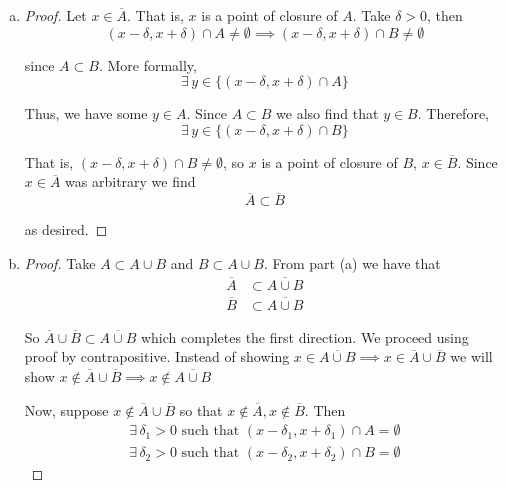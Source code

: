 \documentclass[12pt]{article}
\newlength\tindent
\renewcommand{\indent}{\hspace*{\tindent}}
\begin{document}
\begin{enumerate}[(a)]
	\item 
	\begin{proof} Let $x \in \overline{A}$. That is, $x$ is a point of closure of $A$. Take $\delta > 0$, then
	\begin{equation*}
		(x - \delta, x + \delta) \cap A \neq \emptyset \implies (x - \delta, x + \delta) \cap B \neq \emptyset
	\end{equation*}
	
	since $A \subset B$. More formally,
	\begin{equation*}
		\exists\,y\in \{(x - \delta, x + \delta) \cap A\}
	\end{equation*}
	
	Thus, we have some $y \in A$. Since $A \subset B$ we also find that $y \in B$. Therefore,
	\begin{equation*}
		\exists\,y\in \{(x - \delta, x + \delta) \cap B\}
	\end{equation*}
	
	\indent That is, $(x - \delta, x + \delta) \cap B \neq \emptyset$, so $x$ is a point of closure of $B$, $x \in \overline{B}$. Since $x \in \overline{A}$ was arbitrary we find
	\begin{equation*}
		\overline{A} \subset \overline{B}
	\end{equation*}
	
	as desired.
	\end{proof}
	
	\item
	\begin{proof} Take $A \subset A \cup B$ and $B \subset A \cup B$. From part (a) we have that
	\begin{align*}
		\overline{A} &\subset \overline{A \cup B} \\
		\overline{B} &\subset \overline{A \cup B}
	\end{align*}
	
	\indent So $\overline{A} \cup \overline{B} \subset \overline{A \cup B}$ which completes the first direction. We proceed using proof by contrapositive. Instead of showing $x \in \overline{A\cup B} \implies x \in \overline{A} \cup \overline{B}$ we will show $x \notin \overline{A} \cup \overline{B} \implies x \notin \overline{A\cup B}$
	
	
	Now, suppose $x \notin \overline{A} \cup \overline{B}$ so that $x \notin \overline{A}, x \notin \overline{B}$. Then
	\begin{align*}
		\exists\,\delta_1 > 0 \text{ such that } (x - \delta_1, x + \delta_1) \cap A = \emptyset \\
		\exists\,\delta_2 > 0 \text{ such that } (x - \delta_2, x + \delta_2) \cap B = \emptyset
	\end{align*}
	

\end{proof}
\end{enumerate}
\end{document}
